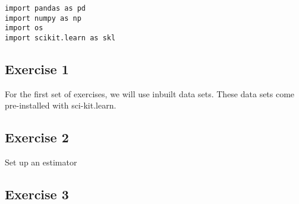\documentclass{article}
\begin{document}
	
	
\begin{framed}
\begin{verbatim}
import pandas as pd
import numpy as np
import os
import scikit.learn as skl
\end{verbatim}
\end{framed}


\subsection*{Exercise 1}

For the first set of exercises, we will use inbuilt data sets. These data sets come pre-installed with sci-kit.learn.





\subsection*{Exercise 2}

Set up an estimator






\subsection*{Exercise 3}
\end{document}
